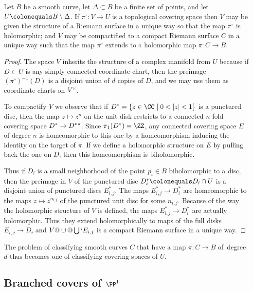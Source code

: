 \begin{theorem}
 Let $B$ be a smooth curve, let $\Delta\subset B$ be a finite set of
 points, and let $U \colonequals  B\setminus \Delta$.
If $\pi^\circ : V \to U$ is a topological covering space then $V$ may
be given the structure of a
Riemann surface
%
in a unique way so that
the map $\pi^\circ$ is holomorphic; and $V$ may be compactified to a
compact Riemann surface $C$ in a unique way such that the map $\pi^\circ$
extends to a holomorphic map $\pi : C \to B$.
\unif
\end{theorem}

\begin{proof}
The space $V$ inherits the structure of a complex manifold from $U$
because if $D \subset U$ is any simply connected coordinate chart,
then the preimage $({\pi^\circ})^{-1}(D)$ is a disjoint union of $d$
copies of $D$, and we may use them as coordinate charts on $V` `$.

To compactify $V$ we observe that if $D^* = \{ z \in \CC \mid 0 < |z|
< 1 \}$ is a punctured disc, then
the map
$z \mapsto z^n$ on the unit disk
restricts to a connected $n$-fold covering
space $D^*\to D^*` `$.
Since $\pi_1(D^*) = \ZZ$, any connected covering space $E$ of degree $n$
is homeomorphic to this one
by a homeomorphism inducing the identity on the target of $\pi$.
If we  define a holomorphic structure on $E$ by pulling back the one on
$D$, then
this homeomorphism is biholomorphic.

Thus if $D_i$ is a small neighborhood of the point $p_i \in B$
biholomorphic to a disc, then the preimage  in $V$ of the punctured
disc $D_i^* \colonequals  D_i \cap U$ is a disjoint union of punctured discs
$E_{i,j}^{*}$. The maps $E^{*}_{i,j} \to D_{i}^{*}$
are homeomorphic to the maps $z\mapsto z^{n_{i,j}}$
of the punctured unit disc
for some
$n_{i,j}$. Because of the way the holomorphic structure
of $V$ is defined, the maps
$E^{*}_{i,j} \to D_{i}^{*}$
are actually
holomorphic. Thus they extend holomorphically
to maps of the full disks $E_{i,j}\to D_{i}$ and $V@\cup@ \bigcup` E_{i,j}$
is a compact Riemann surface in a unique way.
\end{proof}

The problem of classifying smooth curves $C$ that have a map $\pi : C \to B$
of~degree $d$ thus becomes one of classifying covering spaces of $U$.
%

\subsection*{Branched covers of $\PP^1$}

